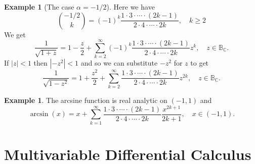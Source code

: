 \documentclass[12pt,a4paper]{book}
\theoremstyle{definition}
\newtheorem{exam}[defn]{Example}
\begin{document}
\begin{exam}[The case $\alpha=-1/2$]
    Here we have
    $$
    \binom{-1 / 2}{k}=(-1)^k \frac{1 \cdot 3 \cdot \cdots \cdot(2 k-1)}{2 \cdot 4 \cdot \cdots \cdot 2 k}, \quad k \geq 2
    $$
    We get
    $$
    \frac{1}{\sqrt{1+z}}=1-\frac{z}{2}+\sum_{k=2}^{\infty}(-1)^k \frac{1 \cdot 3 \cdot \cdots \cdot(2 k-1)}{2 \cdot 4 \cdot \cdots \cdot 2 k} z^k, \quad z \in \mathbb{B}_{\mathbb{C}} .
    $$
    If $|z|<1$ then $\left|-z^2\right|<1$ and so we can substitute $-z^2$ for $z$ to get
    $$
    \frac{1}{\sqrt{1-z^2}}=1+\frac{z^2}{2}+\sum_{k=2}^{\infty} \frac{1 \cdot 3 \cdot \cdots \cdot(2 k-1)}{2 \cdot 4 \cdot \cdots \cdot 2 k} z^{2 k}, \quad z \in \mathbb{B}_{\mathbb{C}} .
    $$  
\end{exam}
\begin{exam}
    The arcsine function is real analytic on $(-1,1)$ and
$$
\arcsin (x)=x+\sum_{k=1}^{\infty} \frac{1 \cdot 3 \cdot \cdots \cdot(2 k-1)}{2 \cdot 4 \cdot \cdots \cdot 2 k} \frac{x^{2 k+1}}{2 k+1}, \quad x \in(-1,1) .
$$
\end{exam}



\newpage
\section{Multivariable Differential Calculus}
\end{document}
